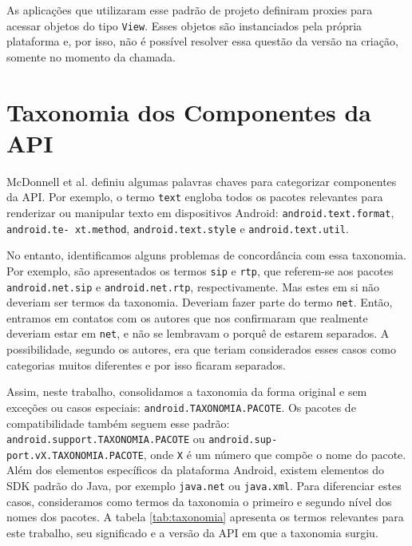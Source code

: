 As aplicações que utilizaram esse padrão de projeto definiram proxies para acessar
objetos do tipo \texttt{View}. Esses objetos são instanciados pela própria plataforma
e, por isso, não é possível resolver essa questão da versão na criação, somente no
momento da chamada. 


\section{Taxonomia dos Componentes da API}
\label{sec:taxonomia}

McDonnell et al. \cite{McDonnell2013} definiu algumas palavras chaves para
categorizar componentes da API. Por exemplo, o termo \texttt{text} engloba todos
os pacotes relevantes para renderizar ou manipular texto em dispositivos Android:
\texttt{android.text.format}, \texttt{android.te- xt.method}, \texttt{android.text.style}
e \texttt{android.text.util}.

No entanto, identificamos alguns problemas de concordância com essa taxonomia.
Por exemplo, são apresentados os termos \texttt{sip} e \texttt{rtp}, que referem-se
aos pacotes \texttt{android.net.sip} e \texttt{android.net.rtp}, respectivamente.
Mas estes em si não deveriam ser termos da taxonomia. Deveriam fazer parte do termo
\texttt{net}. Então, entramos em contatos com os autores que nos confirmaram que
realmente deveriam estar em \texttt{net}, e não se lembravam o porquê de estarem
separados. A possibilidade, segundo os autores, era que teriam considerados esses
casos como categorias muitos diferentes e por isso ficaram separados.

Assim, neste trabalho, consolidamos a taxonomia da forma original e sem exceções
ou casos especiais: \texttt{android.TAXONOMIA.PACOTE}. Os pacotes de compatibilidade
também seguem esse padrão: \texttt{android.support.TAXONOMIA.PACOTE} ou
\texttt{android.sup- port.vX.TAXONOMIA.PACOTE}, %
onde \texttt{X} é um número que compõe
o nome do pacote. Além dos elementos específicos da plataforma Android, existem
elementos do SDK padrão do Java, por exemplo \texttt{java.net} ou \texttt{java.xml}.
Para diferenciar estes casos, consideramos como termos da taxonomia o primeiro e
segundo nível dos nomes dos pacotes.  A tabela \ref{tab:taxonomia} apresenta os
termos relevantes para este trabalho, seu significado e a versão da API em que a
taxonomia surgiu.

